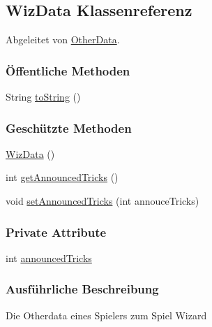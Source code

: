 \hypertarget{a00071}{\subsection{Wiz\-Data Klassenreferenz}
\label{a00071}
}


Abgeleitet von \hyperlink{a00064}{Other\-Data}.

\subsubsection*{Öffentliche Methoden}
\begin{DoxyCompactItemize}
\item 
\hypertarget{a00071_ad146fa8579a5f8a876c4688cc5a68520}{String \hyperlink{a00071_ad146fa8579a5f8a876c4688cc5a68520}{to\-String} ()}\label{a00071_ad146fa8579a5f8a876c4688cc5a68520}

\end{DoxyCompactItemize}
\subsubsection*{Geschützte Methoden}
\begin{DoxyCompactItemize}
\item 
\hypertarget{a00071_aed379e84e00b3b251171f2c15c043163}{\hyperlink{a00071_aed379e84e00b3b251171f2c15c043163}{Wiz\-Data} ()}\label{a00071_aed379e84e00b3b251171f2c15c043163}

\item 
int \hyperlink{a00071_a9cd436529705e057356777b60adfb9ad}{get\-Announced\-Tricks} ()
\item 
void \hyperlink{a00071_a7c3b4781fcd4ae54fb77493710ebe372}{set\-Announced\-Tricks} (int annouce\-Tricks)
\end{DoxyCompactItemize}
\subsubsection*{Private Attribute}
\begin{DoxyCompactItemize}
\item 
\hypertarget{a00071_aadc58c6b93ac9e8013dbb90fe6095803}{int \hyperlink{a00071_aadc58c6b93ac9e8013dbb90fe6095803}{announced\-Tricks}}\label{a00071_aadc58c6b93ac9e8013dbb90fe6095803}

\end{DoxyCompactItemize}


\subsubsection{Ausführliche Beschreibung}
Die Otherdata eines Spielers zum Spiel Wizard 

